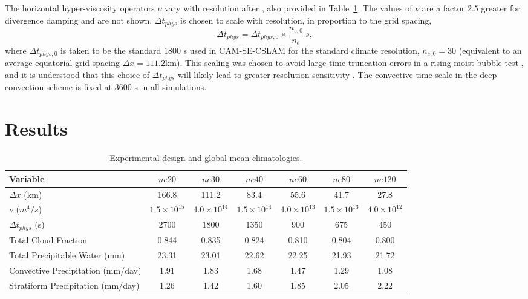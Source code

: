 \documentclass[times]{qjrms4}
\begin{document}
The horizontal hyper-viscosity operators $\nu$ vary with resolution after \cite{HETAL2019JAMES}, also provided in Table~\ref{tbl:table1}. The values of $\nu$ are a factor 2.5 greater for divergence damping and are not shown. $\Delta t_{phys}$ is chosen to scale with resolution, in proportion to the grid spacing,
\begin{equation}
\Delta t_{phys} = \Delta t_{phys,0} \times \frac{n_{e,0}}{n_e}~s,\label{eq:dt-scale}
\end{equation}
where $\Delta t_{phys,0}$ is taken to be the standard $1800$ s used in CAM-SE-CSLAM for the standard climate resolution, $n_{e,0} = 30$ (equivalent to an average equatorial grid spacing $\Delta x = 111.2$km). This scaling was chosen to avoid large time-truncation errors in a rising moist bubble test \citep[Appendix A in][]{HETAL2019JAMES}, and it is understood that this choice of $\Delta t_{phys}$ will likely lead to greater resolution sensitivity \citep{W2008TELLUS}. The convective time-scale in the deep convection scheme is fixed at 3600 s in all simulations.
 
 \section{Results}
 
  \begin{table}
 \caption{Experimental design and global mean climatologies.}
 \centering
 \scriptsize
 \begin{tabular}{lcccccc}
   \hline
   Variable & $ne20$ & $ne30$ & $ne40$ & $ne60$ & $ne80$ & $ne120$ \\ 
   \hline
   $\Delta x$ (km) & 166.8 & 111.2 & 83.4 & 55.6 & 41.7 & 27.8 \\
   $\nu$ ($m^4/s$) & $1.5 \times 10^{15}$ & $4.0 \times 10^{14}$ & $1.5 \times 10^{14}$ & $4.0 \times 10^{13}$  & $1.5 \times 10^{13}$ & $4.0 \times 10^{12}$\\
    $\Delta t_{phys}$ (s) & 2700 & 1800 & 1350 & 900 & 675 & 450 \\
   Total Cloud Fraction & 0.844 & 0.835 & 0.824 & 0.810 & 0.804 & 0.800 \\ 
   Total Precipitable Water (mm) & 23.31& 23.01 & 22.62 & 22.25 & 21.93 & 21.72 \\
   Convective Precipitation (mm/day) & 1.91 & 1.83 & 1.68 & 1.47 & 1.29 & 1.08 \\
   Stratiform Precipitation (mm/day) & 1.26 & 1.42 & 1.60 & 1.85 & 2.05 & 2.22 \\      
 \hline
 \end{tabular}
 \label{tbl:table1}
 \end{table}
\end{document}
